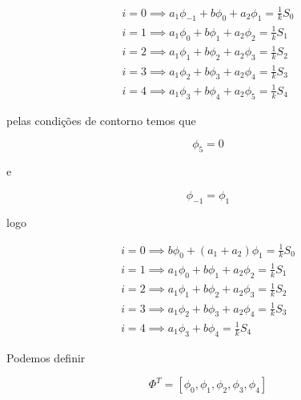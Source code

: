 \documentclass{article}
\begin{document}
                \begin{eqnarray}
                    i=0 \implies a_1 \phi_{-1} + b \phi_0 + a_2 \phi_1 = \frac{1}{k} S_0 \nonumber \\
                    i=1 \implies a_1 \phi_0 + b \phi_1 + a_2 \phi_2 = \frac{1}{k} S_1 \nonumber \\
                    i=2 \implies a_1 \phi_1 + b \phi_2 + a_2 \phi_3 = \frac{1}{k} S_2 \nonumber \\
                    i=3 \implies a_1 \phi_2 + b \phi_3 + a_2 \phi_4 = \frac{1}{k} S_3 \nonumber \\
                    i=4 \implies a_1 \phi_3 + b \phi_4 + a_2 \phi_5 = \frac{1}{k} S_4 \nonumber
                \end{eqnarray}

                pelas condições de contorno temos que

                \begin{equation}
                    \phi_5 = 0
                \end{equation}

                e

                \begin{equation}
                    \phi_{-1} = \phi_1
                \end{equation}

                logo

                \begin{eqnarray}
                    i=0 \implies b \phi_0 + (a_1 + a_2) \phi_1 = \frac{1}{k} S_0 \nonumber \\
                    i=1 \implies a_1 \phi_0 + b \phi_1 + a_2 \phi_2 = \frac{1}{k} S_1 \nonumber \\
                    i=2 \implies a_1 \phi_1 + b \phi_2 + a_2 \phi_3 = \frac{1}{k} S_2 \nonumber \\
                    i=3 \implies a_1 \phi_2 + b \phi_3 + a_2 \phi_4 = \frac{1}{k} S_3 \nonumber \\
                    i=4 \implies a_1 \phi_3 + b \phi_4 = \frac{1}{k} S_4 \nonumber
                \end{eqnarray}

                Podemos definir

                \begin{equation}
                    \Phi^T = [ \phi_0,\phi_1,\phi_2,\phi_3,\phi_4]
                \end{equation}
\end{document}
